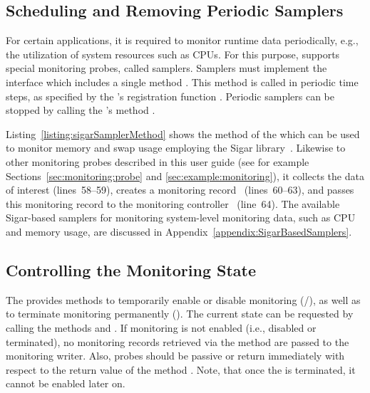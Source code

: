 \subsection{Scheduling and Removing Periodic Samplers}\label{sec:componentsMonitoring:monitoringController:periodicSamplers}

For certain applications, it is required to monitor runtime data periodically, %
e.g., the utilization of system resources such as CPUs. %
For this purpose, \Kieker{} supports special monitoring probes, called samplers. %
Samplers must implement the interface  which includes a %
single method . %
This method is called in periodic time steps, %
as specified by the 's registration function %
. Periodic samplers can be stopped by %
calling the 's method .

Listing~\ref{listing:sigarSamplerMethod} shows the  method %
of the  which can be used to monitor memory %
and swap usage employing the Sigar library~\cite{HypericSigarWebsite}. %
Likewise to other monitoring probes described in this user guide (see for %
example Sections~\ref{sec:monitoring:probe} and \ref{sec:example:monitoring}),
it collects the data of interest (lines~58--59), creates a monitoring record~%
(lines~60--63), and passes this monitoring record to the monitoring controller~%
(line~64). %
The available Sigar-based samplers for monitoring system-level monitoring %
data, such as CPU and memory usage, are discussed in Appendix~\ref{appendix:SigarBasedSamplers}. %

\pagebreak

\setJavaCodeListing


\subsection{Controlling the Monitoring State}\label{sec:componentsMonitoring:monitoringController:controState}

The  provides methods to temporarily enable or disable monitoring %
(/), as well as to terminate monitoring %
permanently (). %
The current state can be requested by calling the methods  %
and . If monitoring is not enabled (i.e., disabled %
or terminated), no monitoring records retrieved via the method  %
are passed to the monitoring writer. Also, probes should be passive or return immediately %
with respect to the return value of the method . %
Note, that once the  is terminated, it cannot be enabled %
later on.

